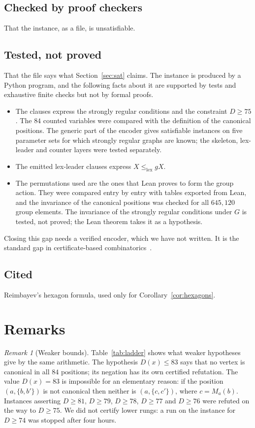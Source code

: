 \documentclass[11pt]{amsart}
\theoremstyle{remark}
\newtheorem{remark}[theorem]{Remark}
\begin{document}
\subsection*{Checked by proof checkers}
That the instance, as a file, is unsatisfiable.

\subsection*{Tested, not proved}
That the file says what Section~\ref{sec:sat} claims. The instance is produced
by a Python program, and the following facts about it are supported by tests
and exhaustive finite checks but not by formal proofs.
\begin{itemize}
\item The clauses express the strongly regular conditions and the constraint
$D\ge75$. The $84$ counted variables were compared with the definition of the
canonical positions. The generic part of the encoder gives satisfiable
instances on five parameter sets for which strongly regular graphs are known;
the skeleton, lex-leader and counter layers were tested separately.
\item The emitted lex-leader clauses express $X\le_{\mathrm{lex}}gX$.
\item The permutations used are the ones that Lean proves to form the group
action. They were compared entry by entry with tables exported from Lean, and
the invariance of the canonical positions was checked for all $645{,}120$
group elements. The invariance of the strongly regular conditions under $G$ is
tested, not proved; the Lean theorem takes it as a hypothesis.
\end{itemize}
Closing this gap needs a verified encoder, which we have not written. It is
the standard gap in certificate-based
combinatorics~\cite{Pythagorean}.

\subsection*{Cited}
Reimbayev's hexagon formula, used only for Corollary~\ref{cor:hexagons}.

\section{Remarks}

\begin{remark}[Weaker bounds]
Table~\ref{tab:ladder} shows what weaker hypotheses give by the same
arithmetic. The hypothesis $D(x)\le83$ says that no vertex is canonical in all
$84$ positions; its negation has its own certified refutation. The value
$D(x)=83$ is impossible for an elementary reason: if the position
$(a,\{b,b'\})$ is not canonical then neither is $(a,\{c,c'\})$, where
$c=M_a(b)$. Instances asserting $D\ge81$, $D\ge79$, $D\ge78$, $D\ge77$ and
$D\ge76$ were refuted on the way to $D\ge75$. We did not certify lower
rungs: a run on the instance for $D\ge74$ was stopped after four hours.
\end{remark}
\end{document}
